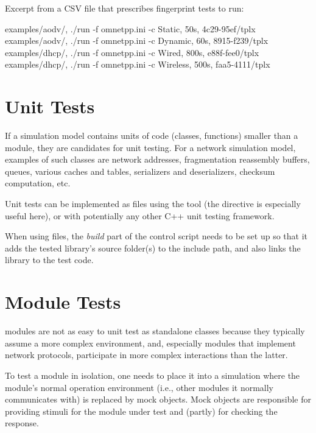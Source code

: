 Excerpt from a CSV file that prescribes fingerprint tests to run:

\begin{filelisting}
examples/aodv/, ./run -f omnetpp.ini -c Static,   50s,  4c29-95ef/tplx
examples/aodv/, ./run -f omnetpp.ini -c Dynamic,  60s,  8915-f239/tplx
examples/dhcp/, ./run -f omnetpp.ini -c Wired,    800s, e88f-fee0/tplx
examples/dhcp/, ./run -f omnetpp.ini -c Wireless, 500s, faa5-4111/tplx
\end{filelisting}


\section{Unit Tests}
\label{sec:testing:unit-tests}

If a simulation model contains units of code (classes, functions) smaller than a
module, they are candidates for unit testing. For a network simulation model,
examples of such classes are network addresses, fragmentation reassembly
buffers, queues, various caches and tables, serializers and deserializers,
checksum computation, etc.

Unit tests can be implemented as  files using the 
tool (the  directive is especially useful here), or with
potentially any other C++ unit testing framework.

When using  files, the \textit{build} part of the control script
needs to be set up so that it adds the tested library's source folder(s) to the
include path, and also links the library to the test code.



\section{Module Tests}
\label{sec:testing:module-tests}

{\opp} modules are not as easy to unit test as standalone classes because
they typically assume a more complex environment, and, especially modules
that implement network protocols, participate in more complex interactions
than the latter.

To test a module in isolation, one needs to place it into a simulation where
the module's normal operation environment (i.e., other modules it normally
communicates with) is replaced by mock objects. Mock objects are responsible
for providing stimuli for the module under test and (partly) for checking
the response.

